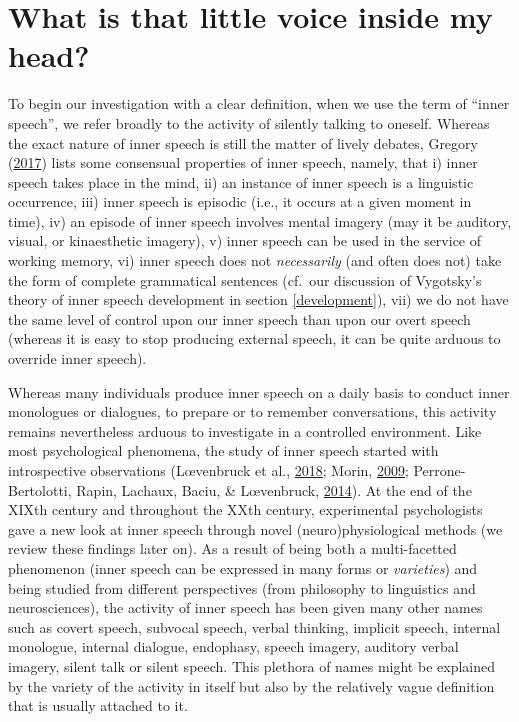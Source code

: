 \documentclass[a4paper,12pt,twoside,onecolumn,openright,final,oldfontcommands]{memoir}
\begin{document}
\hypertarget{what-is-that-little-voice-inside-my-head}{%
\section{What is that little voice inside my head?}\label{what-is-that-little-voice-inside-my-head}}

To begin our investigation with a clear definition, when we use the term of \enquote{inner speech}, we refer broadly to the activity of silently talking to oneself. Whereas the exact nature of inner speech is still the matter of lively debates, Gregory (\protect\hyperlink{ref-gregory_inner_2017}{2017}) lists some consensual properties of inner speech, namely, that i) inner speech takes place in the mind, ii) an instance of inner speech is a linguistic occurrence, iii) inner speech is episodic (i.e., it occurs at a given moment in time), iv) an episode of inner speech involves mental imagery (may it be auditory, visual, or kinaesthetic imagery), v) inner speech can be used in the service of working memory, vi) inner speech does not \emph{necessarily} (and often does not) take the form of complete grammatical sentences (cf.~our discussion of Vygotsky's theory of inner speech development in section \ref{development}), vii) we do not have the same level of control upon our inner speech than upon our overt speech (whereas it is easy to stop producing external speech, it can be quite arduous to override inner speech).

Whereas many individuals produce inner speech on a daily basis to conduct inner monologues or dialogues, to prepare or to remember conversations, this activity remains nevertheless arduous to investigate in a controlled environment. Like most psychological phenomena, the study of inner speech started with introspective observations (Lœvenbruck et al., \protect\hyperlink{ref-loevenbruck_cognitive_2018}{2018}; Morin, \protect\hyperlink{ref-morin_inner_2009}{2009}; Perrone-Bertolotti, Rapin, Lachaux, Baciu, \& Lœvenbruck, \protect\hyperlink{ref-Perrone-Bertolotti2014}{2014}). At the end of the XIXth century and throughout the XXth century, experimental psychologists gave a new look at inner speech through novel (neuro)physiological methods (we review these findings later on). As a result of being both a multi-facetted phenomenon (inner speech can be expressed in many forms or \emph{varieties}) and being studied from different perspectives (from philosophy to linguistics and neurosciences), the activity of inner speech has been given many other names such as covert speech, subvocal speech, verbal thinking, implicit speech, internal monologue, internal dialogue, endophasy, speech imagery, auditory verbal imagery, silent talk or silent speech. This plethora of names might be explained by the variety of the activity in itself but also by the relatively vague definition that is usually attached to it.
\end{document}

